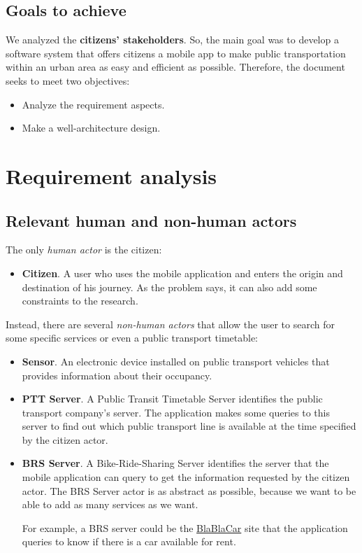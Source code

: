 \documentclass[a4paper]{article}
\begin{document}
    \subsection*{Goals to achieve}

    We analyzed the \textbf{citizens' stakeholders}. So, the main goal was to develop a software system that offers citizens a mobile app to make public transportation within an urban area as easy and efficient as possible. Therefore, the document seeks to meet two objectives:
    \begin{itemize}
        \item Analyze the requirement aspects.

        \item Make a well-architecture design.
    \end{itemize}

    \newpage

    \section{Requirement analysis}

    \subsection{Relevant human and non-human actors}

    The only \emph{human actor} is the citizen:
    \begin{itemize}
        \item \textbf{Citizen}. A user who uses the mobile application and enters the origin and destination of his journey. As the problem says, it can also add some constraints to the research.
    \end{itemize}
    Instead, there are several \emph{non-human actors} that allow the user to search for some specific services or even a public transport timetable:
    \begin{itemize}
        \item \textbf{Sensor}. An electronic device installed on public transport vehicles that provides information about their occupancy.

        \item \textbf{PTT Server}. A Public Transit Timetable Server identifies the public transport company's server. The application makes some queries to this server to find out which public transport line is available at the time specified by the citizen actor.
        
        \item \textbf{BRS Server}. A Bike-Ride-Sharing Server identifies the server that the mobile application can query to get the information requested by the citizen actor. The BRS Server actor is as abstract as possible, because we want to be able to add as many services as we want. 
        
        For example, a BRS server could be the \href{https://www.blablacar.co.uk/}{BlaBlaCar} site that the application queries to know if there is a car available for rent.
    \end{itemize}
\end{document}
